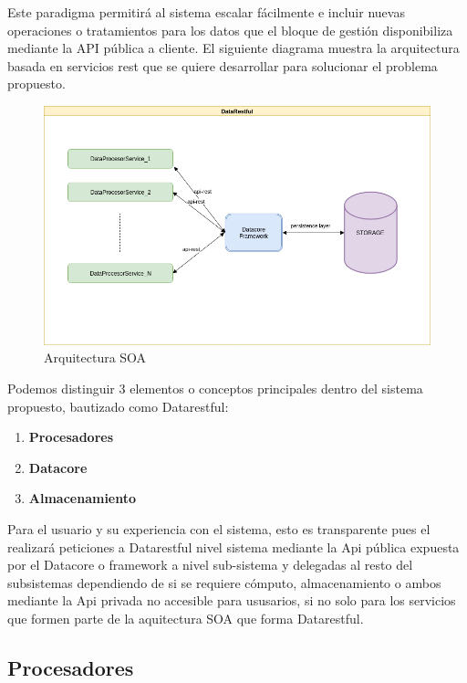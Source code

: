 \documentclass[a4paper,11pt]{book}
\begin{document}
Este paradigma permitirá al sistema escalar fácilmente e incluir nuevas operaciones o tratamientos para los datos que el bloque de gestión disponibiliza mediante la API pública a cliente. El siguiente diagrama muestra la arquitectura basada en servicios rest que se quiere desarrollar para solucionar el problema propuesto. 


\begin{figure}[H]  
\centering 
\includegraphics[scale=0.35]{imagenes/arquitectura_datarest.png}
\caption{ Arquitectura SOA }  
\end{figure} 

Podemos distinguir 3 elementos o conceptos principales dentro del sistema propuesto, bautizado como Datarestful:

\begin{enumerate}
\item \textbf{Procesadores}
\item \textbf{Datacore}
\item \textbf{Almacenamiento}
\end{enumerate}


Para el usuario y su experiencia con el sistema, esto es transparente pues el realizará peticiones a Datarestful nivel sistema mediante la Api pública expuesta por el Datacore o framework a nivel sub-sistema y delegadas al resto del subsistemas dependiendo de si se requiere cómputo, almacenamiento o ambos mediante la Api privada no accesible para ususarios, si no solo para los servicios que formen parte de la aquitectura SOA que forma Datarestful. 

\subsection{Procesadores}
\end{document}
